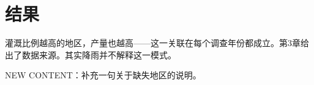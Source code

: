 \documentclass{ctexart}
\begin{document}
\section{结果}
灌溉比例越高的地区，产量也越高——这一关联在每个调查年份都成立。第3章给出了数据来源。其实降雨并不解释这一模式。

NEW CONTENT：补充一句关于缺失地区的说明。
\end{document}
